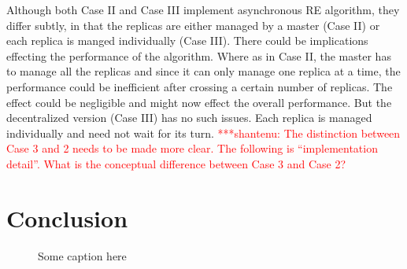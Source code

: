 \documentclass[a4paper,10pt]{article}
\newcommand{\jhanote}[1]{ {\textcolor{red} { ***shantenu: #1 }}}
\newcommand{\athotanote}[1]{ {\textcolor{green} { ***athota: #1 }}}
\newcommand{\jhanote}[1]{}
\newcommand{\athotanote}[1]{}
\begin{document}
Although both Case II and Case III implement asynchronous 
RE algorithm, they differ subtly, in that the replicas
are either managed by a master (Case II) or each replica
is manged individually (Case III).
There could be implications effecting the performance of the
algorithm. Where as in Case II, the master has to manage all the
replicas and since it can only manage one replica at a time, the
performance could be inefficient after crossing a certain number of
replicas. The effect could be negligible and might now effect the
overall performance. But the decentralized version (Case III) has no
such issues. Each replica is managed individually and need not wait
for its turn.  \jhanote{The distinction between Case 3 and 2 needs to
  be made more clear. The following is ``implementation detail''. What
  is the conceptual difference between Case 3 and Case 2?}
  

\section{Conclusion}







\begin{figure}
\centering
{}
\caption{\small Some caption here}
\label{fig:decentralized}
\end{figure}
\end{document}

